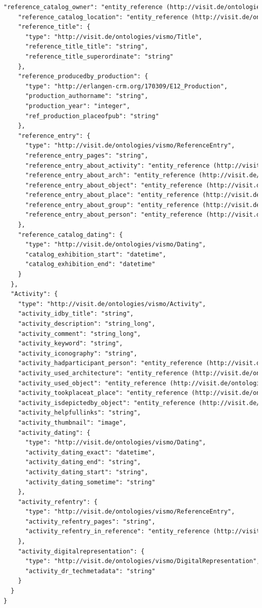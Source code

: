 \begin{lstlisting}[caption={JSON \q{Schema} der ViSIT Daten, die über die REST API ausgespielt werden.},label={lst:json},captionpos=b,language=xml]
    "reference_catalog_owner": "entity_reference (http://visit.de/ontologies/vismo/Institution)",
    "reference_catalog_location": "entity_reference (http://visit.de/ontologies/vismo/Institution)",
    "reference_title": {
      "type": "http://visit.de/ontologies/vismo/Title",
      "reference_title_title": "string",
      "reference_title_superordinate": "string"
    },
    "reference_producedby_production": {
      "type": "http://erlangen-crm.org/170309/E12_Production",
      "production_authorname": "string",
      "production_year": "integer",
      "ref_production_placeofpub": "string"
    },
    "reference_entry": {
      "type": "http://visit.de/ontologies/vismo/ReferenceEntry",
      "reference_entry_pages": "string",
      "reference_entry_about_activity": "entity_reference (http://visit.de/ontologies/vismo/Activity)",
      "reference_entry_about_arch": "entity_reference (http://visit.de/ontologies/vismo/Architecture)",
      "reference_entry_about_object": "entity_reference (http://visit.de/ontologies/vismo/Object)",
      "reference_entry_about_place": "entity_reference (http://visit.de/ontologies/vismo/Place)",
      "reference_entry_about_group": "entity_reference (http://visit.de/ontologies/vismo/Group)",
      "reference_entry_about_person": "entity_reference (http://visit.de/ontologies/vismo/Person)"
    },
    "reference_catalog_dating": {
      "type": "http://visit.de/ontologies/vismo/Dating",
      "catalog_exhibition_start": "datetime",
      "catalog_exhibition_end": "datetime"
    }
  },
  "Activity": {
    "type": "http://visit.de/ontologies/vismo/Activity",
    "activity_idby_title": "string",
    "activity_description": "string_long",
    "activity_comment": "string_long",
    "activity_keyword": "string",
    "activity_iconography": "string",
    "activity_hadparticipant_person": "entity_reference (http://visit.de/ontologies/vismo/Person)",
    "activity_used_architecture": "entity_reference (http://visit.de/ontologies/vismo/Architecture)",
    "activity_used_object": "entity_reference (http://visit.de/ontologies/vismo/Object)",
    "activity_tookplaceat_place": "entity_reference (http://visit.de/ontologies/vismo/Place)",
    "activity_isdepictedby_object": "entity_reference (http://visit.de/ontologies/vismo/Object)",
    "activity_helpfullinks": "string",
    "activity_thumbnail": "image",
    "activity_dating": {
      "type": "http://visit.de/ontologies/vismo/Dating",
      "activity_dating_exact": "datetime",
      "activity_dating_end": "string",
      "activity_dating_start": "string",
      "activity_dating_sometime": "string"
    },
    "activity_refentry": {
      "type": "http://visit.de/ontologies/vismo/ReferenceEntry",
      "activity_refentry_pages": "string",
      "activity_refentry_in_reference": "entity_reference (http://visit.de/ontologies/vismo/Reference)"
    },
    "activity_digitalrepresentation": {
      "type": "http://visit.de/ontologies/vismo/DigitalRepresentation",
      "activity_dr_techmetadata": "string"
    }
  }
}
\end{lstlisting}